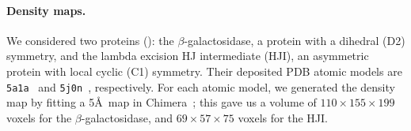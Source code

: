 \paragraph{Density maps.}
We considered two proteins (): the $\beta$-galactosidase, a protein with a dihedral (D2) symmetry, and the lambda excision HJ intermediate (HJI), an asymmetric protein with local cyclic (C1) symmetry.
Their deposited PDB atomic models are \texttt{5a1a}~\cite{bartesaghi2015betagal} and \texttt{5j0n}~\cite{laxmikanthan2016structure}, respectively.
For each atomic model, we generated the density map by fitting a 5\AA\ map in Chimera~\cite{pettersen2004ucsf}; this gave us a volume of $110 \times 155 \times 199$ voxels for the $\beta$-galactosidase, and $69 \times 57 \times 75$ voxels for the HJI\@.

